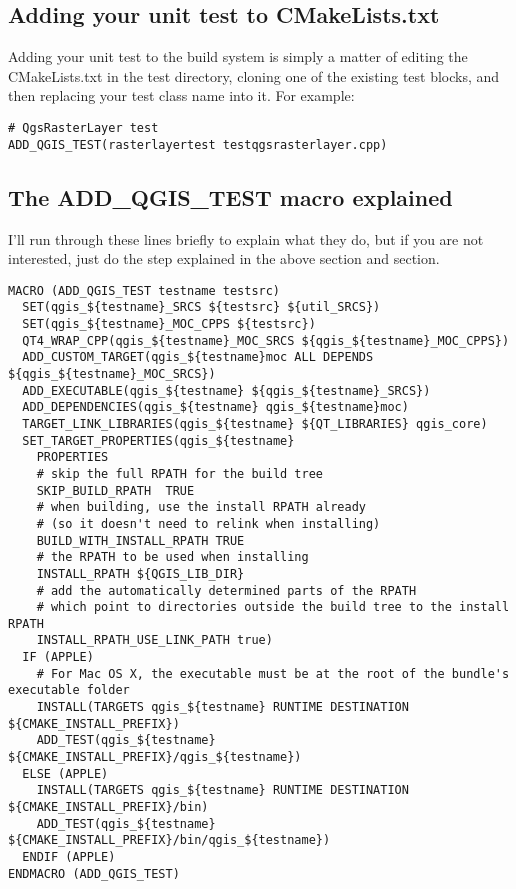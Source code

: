 \hypertarget{toc50}{}
\subsection{Adding your unit test to CMakeLists.txt}
Adding your unit test to the build system is simply a matter of editing the
CMakeLists.txt in the test directory, cloning one of the existing test blocks,
and then replacing your test class name into it.  For example:

\begin{verbatim}
# QgsRasterLayer test
ADD_QGIS_TEST(rasterlayertest testqgsrasterlayer.cpp)
\end{verbatim}

\hypertarget{toc51}{}
\subsection{The ADD\_QGIS\_TEST macro explained}
I'll run through these lines briefly to explain what they do, but if you are
not interested, just do the step explained in the above section and section.

\begin{verbatim}
MACRO (ADD_QGIS_TEST testname testsrc)
  SET(qgis_${testname}_SRCS ${testsrc} ${util_SRCS})
  SET(qgis_${testname}_MOC_CPPS ${testsrc})
  QT4_WRAP_CPP(qgis_${testname}_MOC_SRCS ${qgis_${testname}_MOC_CPPS})
  ADD_CUSTOM_TARGET(qgis_${testname}moc ALL DEPENDS ${qgis_${testname}_MOC_SRCS})
  ADD_EXECUTABLE(qgis_${testname} ${qgis_${testname}_SRCS})
  ADD_DEPENDENCIES(qgis_${testname} qgis_${testname}moc)
  TARGET_LINK_LIBRARIES(qgis_${testname} ${QT_LIBRARIES} qgis_core)
  SET_TARGET_PROPERTIES(qgis_${testname}
    PROPERTIES
    # skip the full RPATH for the build tree
    SKIP_BUILD_RPATH  TRUE
    # when building, use the install RPATH already
    # (so it doesn't need to relink when installing)
    BUILD_WITH_INSTALL_RPATH TRUE
    # the RPATH to be used when installing
    INSTALL_RPATH ${QGIS_LIB_DIR}
    # add the automatically determined parts of the RPATH
    # which point to directories outside the build tree to the install RPATH
    INSTALL_RPATH_USE_LINK_PATH true)
  IF (APPLE)
    # For Mac OS X, the executable must be at the root of the bundle's executable folder
    INSTALL(TARGETS qgis_${testname} RUNTIME DESTINATION ${CMAKE_INSTALL_PREFIX})
    ADD_TEST(qgis_${testname} ${CMAKE_INSTALL_PREFIX}/qgis_${testname})
  ELSE (APPLE)
    INSTALL(TARGETS qgis_${testname} RUNTIME DESTINATION ${CMAKE_INSTALL_PREFIX}/bin)
    ADD_TEST(qgis_${testname} ${CMAKE_INSTALL_PREFIX}/bin/qgis_${testname})
  ENDIF (APPLE)
ENDMACRO (ADD_QGIS_TEST)
\end{verbatim}

